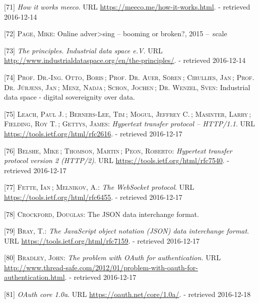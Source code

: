 \documentclass[12pt,english,a4paper,titlepage,cleardoublepage=empty,dottedtoc]{report}
\begin{document}
\hypertarget{ref-web_meeco_how-it-works}{}
{[}71{]} \emph{How it works meeco}. URL
\url{https://meeco.me/how-it-works.html}. - retrieved 2016-12-14

\hypertarget{ref-slides_2015_meeco-case-study}{}
{[}72{]} \textsc{Page, Mike}: Online adver\textgreater{}sing -- booming
or broken?, 2015 --~scale

\hypertarget{ref-web_industrial-data-space}{}
{[}73{]} \emph{The principles. Industrial data space e.V.} URL
\url{http://www.industrialdataspace.org/en/the-principles/}. - retrieved
2016-12-14

\hypertarget{ref-whitepaper_2016_industrial-data-space}{}
{[}74{]} \textsc{Prof. Dr.-Ing. Otto, Boris}\,; \textsc{Prof. Dr. Auer,
Sören}\,; \textsc{Cirullies, Jan}\,; \textsc{Prof. Dr. Jürjens, Jan}\,;
\textsc{Menz, Nadja}\,; \textsc{Schon, Jochen}\,; \textsc{Dr. Wenzel,
Sven}: Industrial data space - digital sovereignity over data.

\hypertarget{ref-web_spec_http1}{}
{[}75{]} \textsc{Leach, Paul J.}\,; \textsc{Berners-Lee, Tim}\,;
\textsc{Mogul, Jeffrey C.}\,; \textsc{Masinter, Larry}\,;
\textsc{Fielding, Roy T.}\,; \textsc{Gettys, James}: \emph{Hypertext
transfer protocol -- HTTP/1.1}. URL
\url{https://tools.ietf.org/html/rfc2616}. - retrieved 2016-12-17

\hypertarget{ref-web_spec_http2}{}
{[}76{]} \textsc{Belshe, Mike}\,; \textsc{Thomson, Martin}\,;
\textsc{Peon, Roberto}: \emph{Hypertext transfer protocol version 2
(HTTP/2)}. URL \url{https://tools.ietf.org/html/rfc7540}. - retrieved
2016-12-17

\hypertarget{ref-web_spec_websockets}{}
{[}77{]} \textsc{Fette, Ian}\,; \textsc{Melnikov, A.}: \emph{The
WebSocket protocol}. URL \url{https://tools.ietf.org/html/rfc6455}. -
retrieved 2016-12-17

\hypertarget{ref-web_spec_json}{}
{[}78{]} \textsc{Crockford, Douglas}: The JSON data interchange format.

\hypertarget{ref-web_rfc_json}{}
{[}79{]} \textsc{Bray, T.}: \emph{The JavaScript object notation (JSON)
data interchange format}. URL \url{https://tools.ietf.org/html/rfc7159}.
- retrieved 2016-12-17

\hypertarget{ref-web_2012_problem-with-oauth-for-authentication}{}
{[}80{]} \textsc{Bradley, John}: \emph{The problem with OAuth for
authentication.} URL
\url{http://www.thread-safe.com/2012/01/problem-with-oauth-for-authentication.html}.
- retrieved 2016-12-17

\hypertarget{ref-web_spec_oauth-1a}{}
{[}81{]} \emph{OAuth core 1.0a}. URL \url{https://oauth.net/core/1.0a/}.
- retrieved 2016-12-18
\end{document}

